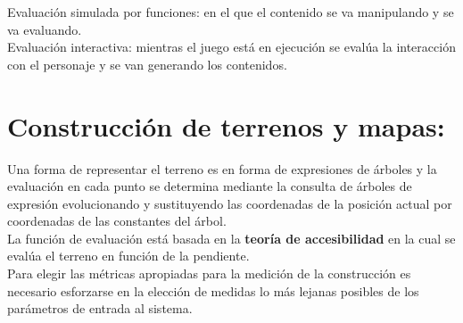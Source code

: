 Evaluación simulada por funciones: en el que el contenido se va manipulando y se va evaluando.\\


Evaluación interactiva: mientras el juego está en ejecución se evalúa la interacción con el personaje y se van generando los contenidos.\\

\section{Construcción de terrenos y mapas:}

Una forma de representar el terreno es en forma de expresiones de árboles y la evaluación en cada punto se determina mediante la consulta de árboles de expresión evolucionando y sustituyendo las coordenadas de la posición actual por coordenadas de las constantes del árbol.\\


La  función de evaluación está basada en la {\bf teoría de accesibilidad} en la cual se evalúa el terreno en función de la pendiente.\\

Para elegir las métricas apropiadas para la medición de la construcción es necesario esforzarse en la elección de medidas lo más lejanas posibles de los parámetros de entrada al sistema.\\


